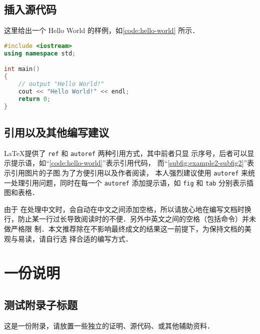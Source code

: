 \documentclass[lang=chs, degree=phd, blindreview=false, adobe=false]{yanputhesis}
\begin{document}
\section{插入源代码}

这里给出一个 Hello World 的样例，如\autoref{code:hello-world} 所示．

\begin{lstlisting}[language={C++}, label={code:hello-world},
    caption={Hello\_World.cpp}]
#include <iostream>
using namespace std;

int main()
{
    // output "Hello World!"
    cout << "Hello World!" << endl;
    return 0;
}
\end{lstlisting}

\section{引用以及其他编写建议}

\LaTeX 提供了 \lstinline`ref` 和 \lstinline`autoref` 两种引用方式，其中前者只显
示序号，后者可以显示提示语，如“\autoref{code:hello-world}”表示引用代码，
而“\autoref{subfig:example2-subfig2}”表示引用图片的子图.为了方便引用以及作者阅读，
本人强烈建议使用 \lstinline`autoref` 来统一处理引用问题，同时在每一个
\lstinline`autoref` 添加提示语，如 \lstinline`fig` 和 \lstinline`tab` 分别表示插
图和表格．

由于 \XeLaTeX 在处理中文时，会自动在中文之间添加空格，所以请放心地在编写文档时换
行，防止某一行过长导致阅读时的不便．另外中英文之间的空格（包括命令）并未做严格限
制．本文推荐除在不影响最终成文的结果这一前提下，为保持文档的美观与易读，请自行选
择合适的编写方式．

\cleardoublepage
\appendix
\chapter{一份说明}

\section{测试附录子标题}

这是一份附录，请放置一些独立的证明、源代码、或其他辅助资料．
\end{document}
